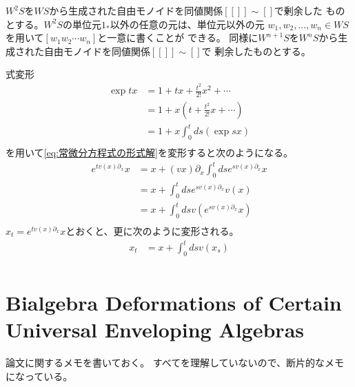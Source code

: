 	$W^2S$を$WS$から生成された自由モノイドを同値関係$[[]]\sim[]$で剰余した
	ものとする。$W^2S$の単位元$1_*$以外の任意の元は、単位元以外の元
	$w_1,w_2,\dots,w_n\in WS$を用いて$[w_1w_2\cdots w_n]$と一意に書くことが
	できる。
	同様に$W^{n+1}S$を$W^nS$から生成された自由モノイドを同値関係$[[]]\sim[]$で
	剰余したものとする。
	\begin{formula}[Picardの再帰法]\label{formula:Picardの再帰法} %
		式変形
		\begin{equation}\begin{split} %
			\exp tx &= 1 + tx + \frac{t^2}{2!}x^2 + \cdots \\
				&= 1 + x(t + \frac{t^2}{2!}x + \cdots) \\
				&= 1 + x\int_0^t ds (\exp sx) \\
		\end{split}\end{equation} %
		を用いて\eqref{eq:常微分方程式の形式解}を変形すると次のようになる。
		\begin{equation}\begin{split} %
			e^{tv(x)\partial_x}x
			&= x + (vx)\partial_x\int_{0}^t dse^{sv(x)\partial_x}x \\
			&= x + \int_{0}^t dse^{sv(x)\partial_x}v(x) \\
			&= x + \int_{0}^t dsv(e^{sv(x)\partial_x}x) \\
		\end{split}\end{equation} %
		$x_t=e^{tv(x)\partial_x}x$とおくと、更に次のように変形される。
		\begin{equation}\begin{split} %
			x_t &= x + \int_0^t dsv(x_s) \\
		\end{split}\end{equation} %
	\end{formula} %

\section{Bialgebra Deformations of Certain Universal Enveloping Algebras}\label{s1:Bialgebra Deformations of Certain Universal Enveloping Algebras} %
	論文\cite{url:grossman:deform}に関するメモを書いておく。
	すべてを理解していないので、断片的なメモになっている。

